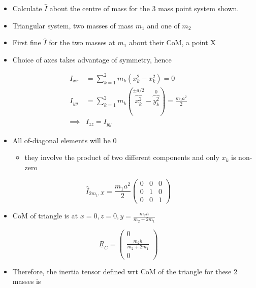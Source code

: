 \documentclass[a4paper,11pt,normalem]{article}
\begin{document}
\begin{example}[2]
\begin{itemize}
\item
  Calculate \(\hat{I}\) about the centre of mass for the 3 mass point
  system shown.
\item
  Triangular system, two masses of mass \(m_1\) and one of \(m_2\)
\item
  First fine \(\hat{I}\) for the two masses at \(m_1\) about their CoM,
  a point X
\item
  Choice of axes takes advantage of symmetry, hence
\end{itemize}

\[
    \begin{aligned}
    I_{xx} &= \sum_{k = 1}^2 m_k (x_k^2 - x_k^2) = 0 \\
    I_{yy} &= \sum_{k = 1}^2 m_k (\overbrace{x_k^2}^{\pm a/2} - \overbrace{y_k^2}^{0}) = \frac{m_1 a^2}{2} \\
    \implies & I_{zz} = I_{yy}
    \end{aligned}
\]

\begin{itemize}
\item
  All of-diagonal elements will be 0
  \begin{itemize}
  \item
    they involve the product of two different components and only
    \(x_k\) is non-zero
  \end{itemize}
\end{itemize}

\[
    \hat{I}_{2m_1,X} = \frac{m_1 a^2}{2} \begin{pmatrix} 0 & 0 & 0 \\ 0 & 1 & 0 \\ 0 & 0 & 1 \end{pmatrix}
\]

\begin{itemize}
\item
  CoM of triangle is at \(x = 0, z= 0, y = \frac{m_2 h}{m_2 + 2m_1}\)
\end{itemize}

\[
    \underline{R}_C = \begin{pmatrix} 0 \\ \frac{m_2 h}{m_2 + 2m_1} \\ 0 \end{pmatrix}
\]

\begin{itemize}
\item
  Therefore, the inertia tensor defined wrt CoM of the triangle for
  these 2 masses is
\end{itemize}


\end{example}
\end{document}
